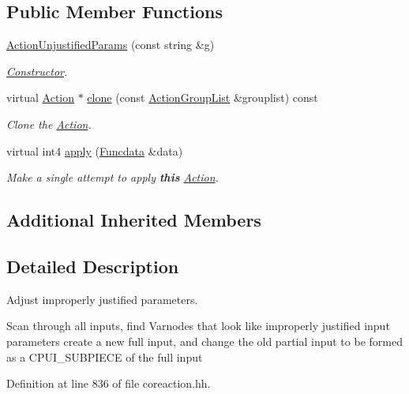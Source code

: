 \subsection*{Public Member Functions}
\begin{DoxyCompactItemize}
\item 
\mbox{\hyperlink{class_action_unjustified_params_aa9ab05dba8cea3e3d8c954483440e0be}{Action\+Unjustified\+Params}} (const string \&g)
\begin{DoxyCompactList}\small\item\em \mbox{\hyperlink{class_constructor}{Constructor}}. \end{DoxyCompactList}\item 
virtual \mbox{\hyperlink{class_action}{Action}} $\ast$ \mbox{\hyperlink{class_action_unjustified_params_a07403536c15bc35659c34d1dec3b2c11}{clone}} (const \mbox{\hyperlink{class_action_group_list}{Action\+Group\+List}} \&grouplist) const
\begin{DoxyCompactList}\small\item\em Clone the \mbox{\hyperlink{class_action}{Action}}. \end{DoxyCompactList}\item 
virtual int4 \mbox{\hyperlink{class_action_unjustified_params_a76dd93b62ac18bb4d18cba2a79c0ac55}{apply}} (\mbox{\hyperlink{class_funcdata}{Funcdata}} \&data)
\begin{DoxyCompactList}\small\item\em Make a single attempt to apply {\bfseries{this}} \mbox{\hyperlink{class_action}{Action}}. \end{DoxyCompactList}\end{DoxyCompactItemize}
\subsection*{Additional Inherited Members}


\subsection{Detailed Description}
Adjust improperly justified parameters. 

Scan through all inputs, find Varnodes that look like improperly justified input parameters create a new full input, and change the old partial input to be formed as a C\+P\+U\+I\+\_\+\+S\+U\+B\+P\+I\+E\+CE of the full input 

Definition at line 836 of file coreaction.\+hh.



